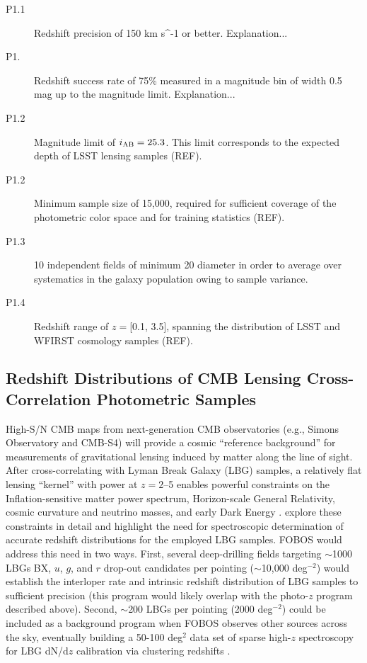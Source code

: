 \documentclass[preprint,11pt]{aastex}
\newcommand{\kms}{{\rm km s^{-1}}}
\begin{document}
\begin{description}

\item[P1.1] Redshift precision of 150 \kms{} or better.  Explanation...

\item[P1.]  Redshift success rate of 75\% measured in a magnitude bin of width 0.5 mag up to the magnitude limit.  Explanation...

\item[P1.2] Magnitude limit of $i_{\rm AB} = 25.3$.  This limit corresponds to the expected depth of LSST lensing samples (REF).

\item[P1.2] Minimum sample size of 15,000, required for sufficient coverage of the photometric color space and for training statistics (REF).

\item[P1.3] 10 independent fields of minimum 20\arcmin{} diameter in order to average over systematics in the galaxy population owing to sample variance.

\item[P1.4] Redshift range of $z = $[0.1, 3.5], spanning the distribution of LSST and WFIRST cosmology samples (REF).

\end{description}



\subsection{Redshift Distributions of CMB Lensing Cross-Correlation Photometric Samples}

High-S/N CMB maps from next-generation CMB observatories (e.g., Simons Observatory and CMB-S4) will provide a cosmic
``reference background'' for measurements of gravitational lensing induced by matter along the line of sight.  After
cross-correlating with Lyman Break Galaxy (LBG) samples, a relatively flat lensing ``kernel'' with power at $z = 2$--5
enables powerful constraints on the Inflation-sensitive matter power spectrum, Horizon-scale General Relativity, cosmic
curvature and neutrino masses, and early Dark Energy \citep{ferraro19}.  \citet{wilson19} explore these constraints in
detail and highlight the need for spectroscopic determination of accurate redshift distributions for the employed LBG
samples. FOBOS would address this need in two ways.  First, several deep-drilling fields targeting $\sim$1000 LBGs BX,
$u$, $g$, and $r$ drop-out candidates per pointing ($\sim$10,000 deg$^{-2}$) would establish the interloper rate and
intrinsic redshift distribution of LBG samples to sufficient precision (this program would likely overlap with the
photo-$z$ program described above).  Second, $\sim$200 LBGs per pointing (2000 deg$^{-2}$) could be included as a
background program when FOBOS observes other sources across the sky, eventually building a 50-100 deg$^2$ data set of
sparse high-$z$ spectroscopy for LBG dN/d$z$ calibration via clustering redshifts \citep[see][]{wilson19}.
\end{document}
